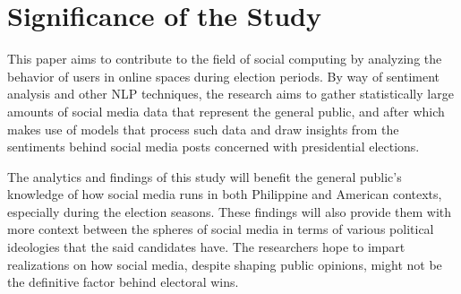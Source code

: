 \section{Significance of the Study}
This paper aims to contribute to the field of social computing by analyzing the behavior of users in online spaces during election periods. By way of sentiment analysis and other NLP techniques, the research aims to gather statistically large amounts of social media data that represent the general public, and after which makes use of models that process such data and draw insights from the sentiments behind social media posts concerned with presidential elections. 

The analytics and findings of this study will benefit the general public's knowledge of how social media runs in both Philippine and American contexts, especially during the election seasons. These findings will also provide them with more context between the spheres of social media in terms of various political ideologies that the said candidates have. The researchers hope to impart realizations on how social media, despite shaping public opinions, might not be the definitive factor behind electoral wins.